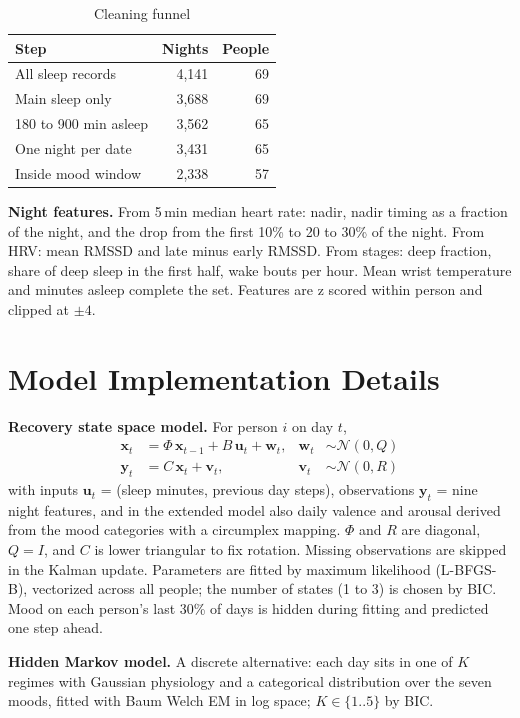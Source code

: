 \documentclass[10pt,twocolumn]{article}
\begin{document}
\begin{table}[h]
\centering\small
\caption{Cleaning funnel}
\label{tab:funnel}
\begin{tabular}{lrr}\toprule
Step & Nights & People\\\midrule
All sleep records & 4{,}141 & 69\\
Main sleep only & 3{,}688 & 69\\
180 to 900 min asleep & 3{,}562 & 65\\
One night per date & 3{,}431 & 65\\
Inside mood window & 2{,}338 & 57\\\bottomrule
\end{tabular}
\end{table}

\textbf{Night features.} From 5\,min median heart rate: nadir, nadir timing as a fraction of the night, and the drop from the first 10\% to 20 to 30\% of the night. From HRV: mean RMSSD and late minus early RMSSD. From stages: deep fraction, share of deep sleep in the first half, wake bouts per hour. Mean wrist temperature and minutes asleep complete the set. Features are z scored within person and clipped at $\pm4$.

\section{Model Implementation Details}
\textbf{Recovery state space model.} For person $i$ on day $t$,
\begin{align*}
\mathbf{x}_t &= \Phi\,\mathbf{x}_{t-1} + B\,\mathbf{u}_t + \mathbf{w}_t, & \mathbf{w}_t&\sim\mathcal{N}(0,Q)\\
\mathbf{y}_t &= C\,\mathbf{x}_t + \mathbf{v}_t, & \mathbf{v}_t&\sim\mathcal{N}(0,R)
\end{align*}
with inputs $\mathbf{u}_t$ = (sleep minutes, previous day steps), observations $\mathbf{y}_t$ = nine night features, and in the extended model also daily valence and arousal derived from the mood categories with a circumplex mapping. $\Phi$ and $R$ are diagonal, $Q=I$, and $C$ is lower triangular to fix rotation. Missing observations are skipped in the Kalman update. Parameters are fitted by maximum likelihood (L-BFGS-B), vectorized across all people; the number of states (1 to 3) is chosen by BIC. Mood on each person's last 30\% of days is hidden during fitting and predicted one step ahead.

\textbf{Hidden Markov model.} A discrete alternative: each day sits in one of $K$ regimes with Gaussian physiology and a categorical distribution over the seven moods, fitted with Baum Welch EM in log space; $K\in\{1..5\}$ by BIC.
\end{document}
